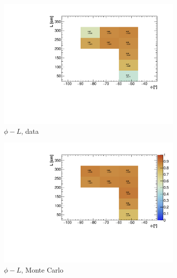 \documentclass[a4paper]{scrartcl}
\begin{document}
\begin{figure}[htbp]
  \begin{center}
    \begin{subfigure}{0.52\textwidth}
      \includegraphics[width=\linewidth]{figures/phi_l_data.pdf}
      \caption{$\phi - L$, data} \label{fig:2d_cry_3}
    \end{subfigure}\begin{subfigure}{0.52\textwidth}
    \includegraphics[width=\linewidth]{figures/phi_l_mc.pdf}
    \caption{$\phi - L$, Monte Carlo}\label{fig:2d_cry_mc_3}
  \end{subfigure}
  \begin{subfigure}{0.52\textwidth}

\end{subfigure}
\end{center}
\end{figure}
\end{document}
